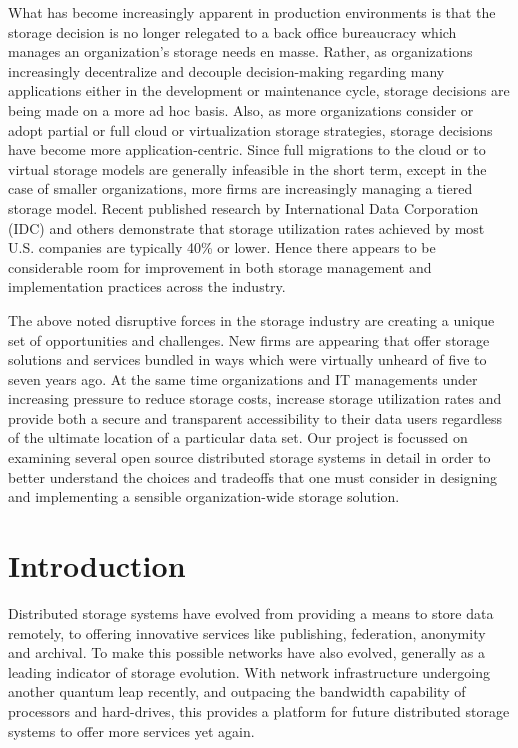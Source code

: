 \documentclass[11pt]{article}
\begin{document}
What has become increasingly apparent in production environments is
that the storage decision is no longer relegated to a back office
bureaucracy which manages an organization’s storage needs en masse.
Rather, as organizations increasingly decentralize and decouple
decision-making regarding many applications either in the development
or maintenance cycle, storage decisions are being made on a more ad
hoc basis. Also, as more organizations consider or adopt partial or
full cloud or virtualization storage strategies, storage decisions
have become more application-centric. Since full migrations to the
cloud or to virtual storage models are generally infeasible in the
short term, except in the case of smaller organizations, more firms
are increasingly managing a tiered storage model. Recent published
research by International Data Corporation (IDC) and others
demonstrate that storage utilization rates achieved by most
U.S. companies are typically 40\% or lower. Hence there appears to be
considerable room for improvement in both storage management and
implementation practices across the industry.

The above noted disruptive forces in the storage industry are creating
a unique set of opportunities and challenges. New firms are appearing
that offer storage solutions and services bundled in ways which were
virtually unheard of five to seven years ago. At the same time
organizations and IT managements under increasing pressure to reduce
storage costs, increase storage utilization rates and provide both a
secure and transparent accessibility to their data users regardless of
the ultimate location of a particular data set. Our project is
focussed on examining several open source distributed storage systems 
in detail in order to better understand the choices and tradeoffs
that one must consider in designing and implementing a sensible
organization-wide storage solution.

\section{Introduction}
Distributed storage systems have evolved from providing a means to
store data remotely, to offering innovative services like publishing,
federation, anonymity and archival. To make this possible networks
have also evolved, generally as a leading indicator of storage
evolution. With network infrastructure undergoing another quantum leap
recently, and outpacing the bandwidth capability of processors and
hard-drives, this provides a platform for future distributed storage
systems to offer more services yet again.
\end{document}
